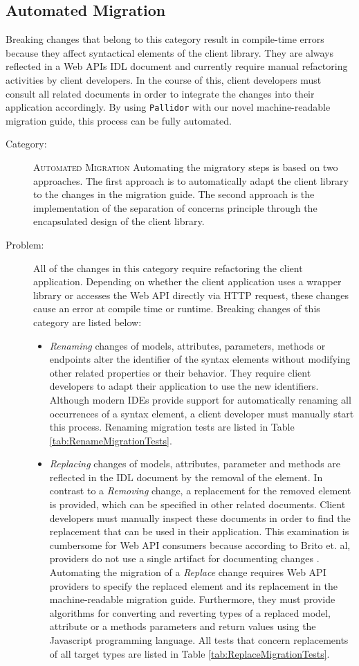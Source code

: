 \subsection{Automated Migration}\label{subsec:EvalAutomated}
Breaking changes that belong to this category result in compile-time errors because they affect syntactical elements of the client library. They are always reflected in a Web APIs IDL document and currently require manual refactoring activities by client developers. In the course of this, client developers must consult all related documents in order to integrate the changes into their application accordingly. By using \texttt{Pallidor} with our novel machine-readable migration guide, this process can be fully automated.
\newpage
\begin{description}
	\item[Category:] \textsc{Automated Migration} \newline Automating the migratory steps is based on two approaches. The first approach is to automatically adapt the client library to the changes in the migration guide. The second approach is the implementation of the separation of concerns principle through the encapsulated design of the client library.
	\item[Problem:] All of the changes in this category require refactoring the client application. Depending on whether the client application uses a wrapper library or accesses the Web API directly via HTTP request, these changes cause an error at compile time or runtime. Breaking changes of this category are listed below:
	\begin{itemize}
		\item \textit{Renaming} changes of models, attributes, parameters, methods or endpoints alter the identifier of the syntax elements without modifying other related properties or their behavior. They require client developers to adapt their application to use the new identifiers. Although modern \acp{IDE} provide support for automatically renaming all occurrences of a syntax element, a client developer must manually start this process. Renaming migration tests are listed in Table \ref{tab:RenameMigrationTests}.
		\item \textit{Replacing} changes of models, attributes, parameter and methods are reflected in the IDL document by the removal of the element. In contrast to a \textit{Removing} change, a replacement for the removed element is provided, which can be specified in other related documents. Client developers must manually inspect these documents in order to find the replacement that can be used in their application. This examination is cumbersome for Web API consumers because according to Brito et. al, providers do not use a single artifact for documenting changes \cite{brito_you_2020}. Automating the migration of a \textit{Replace} change requires Web API providers to specify the replaced element and its replacement in the machine-readable migration guide. Furthermore, they must provide algorithms for converting and reverting types of a replaced model, attribute or a methods parameters and return values using the Javascript programming language. All tests that concern replacements of all target types are listed in Table \ref{tab:ReplaceMigrationTests}.

\end{itemize}
\end{description}
